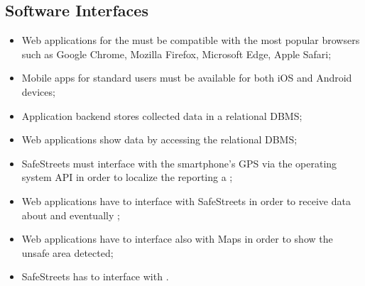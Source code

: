 \documentclass[../../../rasd.tex]{subfiles}
\begin{document}
\subsection{Software Interfaces\label{sect:3.1.3}}
\begin{itemize}
	\item Web applications for the  must be compatible with the most popular browsers such as Google Chrome, Mozilla Firefox, Microsoft Edge, Apple Safari; 
	\item Mobile apps for standard users must be available for both iOS and Android devices;
	\item Application backend stores collected data in a relational DBMS; 
	\item Web applications show data by accessing the relational DBMS; 
	\item SafeStreets must interface with the smartphone's GPS via the operating system API in order to localize the  reporting a ;
	\item Web applications have to interface with SafeStreets in order to receive data about  and eventually ;
	\item Web applications have to interface also with Maps in order to show the unsafe area detected; 
	\item SafeStreets has to interface with .
	 
\end{itemize}
\end{document}
